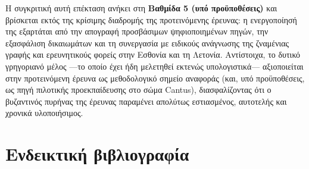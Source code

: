 \documentclass[11pt,a4paper]{article}
\begin{document}
Η συγκριτική αυτή επέκταση ανήκει στη \textbf{Βαθμίδα 5 (υπό προϋποθέσεις)} και βρίσκεται εκτός της κρίσιμης διαδρομής της προτεινόμενης έρευνας: η ενεργοποίησή της εξαρτάται από την απογραφή προσβάσιμων ψηφιοποιημένων πηγών, την εξασφάλιση δικαιωμάτων και τη συνεργασία με ειδικούς ανάγνωσης της ζναμένιας γραφής και ερευνητικούς φορείς στην Εσθονία και τη Λετονία. Αντίστοιχα, το δυτικό γρηγοριανό μέλος ---το οποίο έχει ήδη μελετηθεί εκτενώς υπολογιστικά--- αξιοποιείται στην προτεινόμενη έρευνα ως μεθοδολογικό σημείο αναφοράς (και, υπό προϋποθέσεις, ως πηγή πιλοτικής προεκπαίδευσης στο σώμα Cantus), διασφαλίζοντας ότι ο βυζαντινός πυρήνας της έρευνας παραμένει απολύτως εστιασμένος, αυτοτελής και χρονικά υλοποιήσιμος.


\section*{Ενδεικτική βιβλιογραφία}
\end{document}
